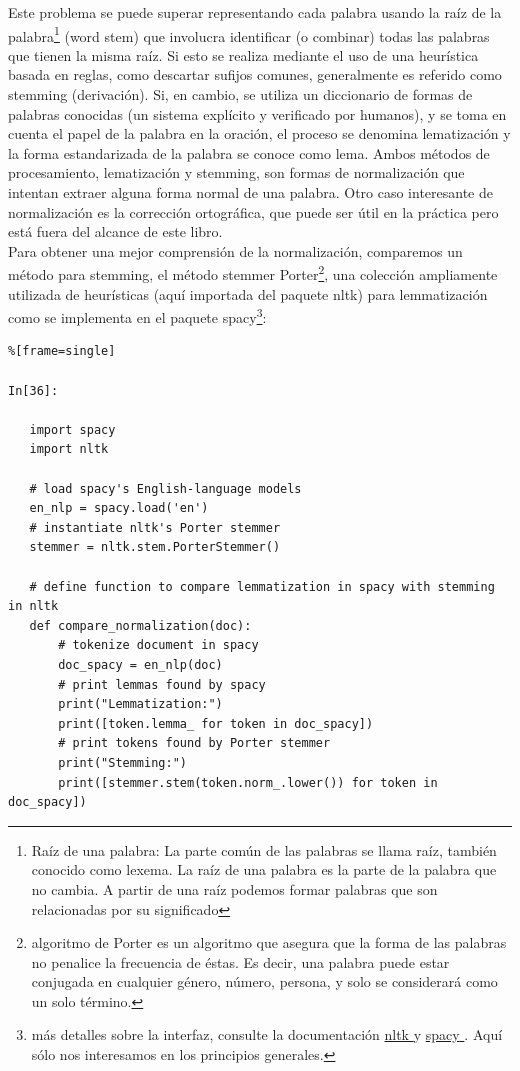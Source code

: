   
Este problema se puede superar representando cada palabra usando la raíz de la 
palabra\footnote{ \scriptsize{Raíz de una palabra: La parte común de las palabras se llama raíz, también 
	conocido como lexema. La raíz de una palabra es la parte de la palabra que no cambia. 
	A partir de una raíz podemos formar palabras que son relacionadas por su significado}} (word stem)
que involucra identificar (o combinar) todas las palabras que tienen la misma raíz.
 Si esto se realiza mediante el uso de una heurística basada en reglas, como descartar 
 sufijos comunes, generalmente es referido como stemming  (derivación).  Si, en cambio, se utiliza 
 un diccionario  de formas de palabras conocidas (un sistema explícito y verificado 
 por humanos), y  se toma  en cuenta el papel de la palabra en la oración, 
 el proceso se denomina lematización y la forma estandarizada de la palabra se 
 conoce como lema.  
Ambos métodos de procesamiento, lematización y stemming, son formas de normalización
  que intentan extraer alguna forma normal de una palabra.   Otro caso interesante de normalización es la corrección ortográfica, que puede ser
útil en la práctica pero está fuera del alcance de este libro.\\

Para obtener una mejor comprensión de la normalización, comparemos un método para stemming,
el método stemmer  Porter{\footnote{\scriptsize	{ algoritmo de Porter es un algoritmo que asegura que
 la forma de las palabras no penalice la frecuencia de éstas. Es decir, una palabra puede
  estar conjugada en cualquier género, número, persona, y solo se considerará como un solo término.}}}, 
una colección ampliamente utilizada de heurísticas (aquí importada del paquete {\ttfamily  nltk}) 
 para lemmatización como se implementa en el paquete {\ttfamily spacy}\footnote{ \scriptsize{ más detalles
 sobre la interfaz, consulte la documentación \href{http://www.nltk.org/}{\textcolor{vino}{\ttfamily nltk} }} y \href{https://spacy.io/}{\textcolor{vino}{\ttfamily spacy} }. Aquí sólo nos interesamos en los principios generales.}:


\begin{lstlisting}%[frame=single]

In[36]:

   import spacy
   import nltk
   
   # load spacy's English-language models
   en_nlp = spacy.load('en')
   # instantiate nltk's Porter stemmer
   stemmer = nltk.stem.PorterStemmer()
   
   # define function to compare lemmatization in spacy with stemming in nltk
   def compare_normalization(doc):
       # tokenize document in spacy
       doc_spacy = en_nlp(doc)
       # print lemmas found by spacy
       print("Lemmatization:")
       print([token.lemma_ for token in doc_spacy])
       # print tokens found by Porter stemmer
       print("Stemming:")
       print([stemmer.stem(token.norm_.lower()) for token in doc_spacy])

\end{lstlisting}


